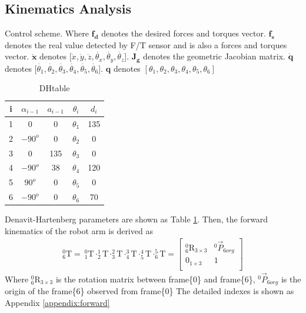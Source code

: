 \documentclass[12pt]{article}
\begin{document}
\begin{CJK}{UTF8}{bsmi}

\section{Kinematics Analysis}
Control scheme. Where $\boldsymbol{f_d}$ denotes the desired forces and torques vector. $\boldsymbol{f_s}$ denotes the real value detected by F/T sensor and is also a forces and torques vector. $\boldsymbol{\dot{x}}$ denotes [$\dot{x}, \dot{y}, \dot{z}, \dot{\theta _x}, \dot{\theta _y}, \dot{\theta _z}$]. $\mathbf{J_g}$ denotes the geometric Jacobian matrix. $\boldsymbol{\dot{q}}$ denotes [$\dot{\theta _1}, \dot{\theta _2}, \dot{\theta _3}, \dot{\theta _4}, \dot{\theta _5}, \dot{\theta _6}$]. $\boldsymbol{q}$ denotes $\left[\theta _1, \theta _2, \theta _3, \theta _4, \theta _5, \theta _6 \right] $


\begin{table}[h]
\centering
\caption{DHtable}
\label{tab:DHtable}
\begin{tabular}{ccccc} 
\hline \hline
	i	&$\alpha _{i-1}$	&$a_{i-1}$	&$\theta _i$			&$d_i$	\\\hline
	1   &0    				&0			&$\theta _1$			&135 \\
	2   &$-90^{o}$   		&0			&$\theta _2$			&0 \\
	3   &0    				&135		&$\theta _3$ 			&0 \\
	4   &$-90^{o}$    		&38			&$\theta _4$ 			&120 \\
	5   &$90^{o}$    		&0			&$\theta _5$ 			&0 \\
	6   &$-90^{o}$    		&0			&$\theta _6$ 			&70 \\
\end{tabular}
\end{table}
Denavit-Hartenberg parameters are shown as Table \ref{tab:DHtable}. Then, the forward kinematics of the robot arm is derived as
\begin{equation*}
\begin{split}
^0_6\text{T} =
\ ^0_1\text{T} \cdot ^1_2\text{T} \cdot ^2_3\text{T} \cdot ^3_4\text{T} \cdot ^4_5\text{T} \cdot ^5_6\text{T} =
\begin{bmatrix}
^0_6\text{R}_{3\times 3} 	&^0\vec{P}_{6org}\\
0_{1\times 3}				&1\\
\end{bmatrix}
\end{split}
\end{equation*}
Where $^0_6\text{R}_{3\times 3}$ is the rotation matrix between frame\{0\} and frame\{6\}, $^0\vec{P}_{6org}$ is the origin of the frame\{6\} observed from frame\{0\}
The detailed indexes is shown as Appendix \ref{appendix:forward}




\end{CJK}
\end{document}
